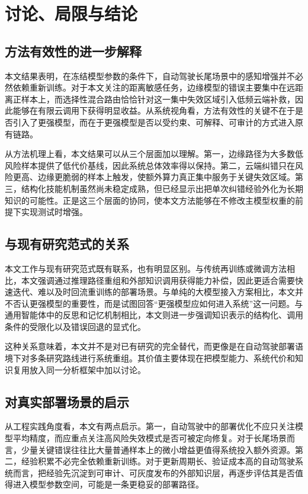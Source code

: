 
\chapter{讨论、局限与结论}
\label{cha:conclusion}

\section{方法有效性的进一步解释}
\label{sec:discussion}

本文结果表明，在冻结模型参数的条件下，自动驾驶长尾场景中的感知增强并不必然依赖重新训练。对于本文关注的距离敏感任务，边缘模型的错误主要集中在远距离正样本上，而选择性混合路由恰恰针对这一集中失效区域引入低频云端补救，因此能够在有限云调用下获得明显收益。从系统视角看，方法有效性的关键不在于是否引入了更强模型，而在于更强模型是否以受约束、可解释、可审计的方式进入原有链路。

从方法机理上看，本文结果可以从三个层面加以理解。第一，边缘路径为大多数低风险样本提供了低代价基线，因此系统总体效率得以保持。第二，云端纠错只在风险更高、边缘更脆弱的样本上触发，使额外算力真正集中服务于关键失效区域。第三，结构化技能机制虽然尚未稳定成熟，但已经显示出把单次纠错经验外化为长期知识的可能性。正是这三个层面的协同，使本文方法能够在不修改主模型权重的前提下实现测试时增强。

\section{与现有研究范式的关系}
\label{sec:discussion-paradigm}

本文工作与现有研究范式既有联系，也有明显区别。与传统再训练或微调方法相比，本文强调通过推理路径重组和外部知识调用获得能力补偿，因此更适合需要快速迭代、难以及时回流重训练的部署场景。与单纯的大模型接入方案相比，本文并不否认更强模型的重要性，而是试图回答“更强模型应如何进入系统”这一问题。与通用智能体中的反思和记忆机制相比，本文则进一步强调知识表示的结构化、调用条件的受限化以及错误回退的显式化。

这种关系意味着，本文并不是对已有研究的完全替代，而更像是在自动驾驶部署语境下对多条研究路线进行系统重组。其价值主要体现在把模型能力、系统代价和知识复用放入同一分析框架中加以讨论。

\section{对真实部署场景的启示}
\label{sec:discussion-deploy}

从工程实践角度看，本文有两点启示。第一，自动驾驶中的部署优化不应只关注模型平均精度，而应重点关注高风险失效模式是否可被定向修复。对于长尾场景而言，少量关键错误往往比大量普通样本上的微小增益更值得系统投入额外资源。第二，经验积累不必完全依赖重新训练。对于更新周期长、验证成本高的自动驾驶系统而言，把经验先沉淀到可审计、可灰度发布的外部知识层，再逐步评估其是否值得进入模型参数空间，可能是一条更稳妥的部署路径。

